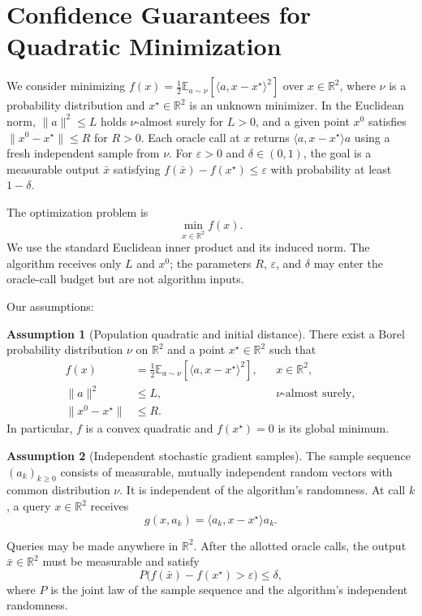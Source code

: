 \documentclass[10pt]{article}
\theoremstyle{definition}
\newtheorem{assumption}{Assumption}
\begin{document}
\section*{Confidence Guarantees for Quadratic Minimization}
We consider minimizing $f(x)=\tfrac12\mathbb{E}_{a\sim\nu}[\langle a,x-x^\star\rangle^2]$ over $x\in\mathbb{R}^2$, where $\nu$ is a probability distribution and $x^\star\in\mathbb{R}^2$ is an unknown minimizer. In the Euclidean norm, $\|a\|^2\leq L$ holds $\nu$-almost surely for $L>0$, and a given point $x^0$ satisfies $\|x^0-x^\star\|\leq R$ for $R>0$. Each oracle call at $x$ returns $\langle a,x-x^\star\rangle a$ using a fresh independent sample from $\nu$. For $\varepsilon>0$ and $\delta\in(0,1)$, the goal is a measurable output $\bar{x}$ satisfying $f(\bar{x})-f(x^\star)\leq\varepsilon$ with probability at least $1-\delta$.

The optimization problem is
\[
\min_{x\in\mathbb{R}^2} f(x).
\]
We use the standard Euclidean inner product and its induced norm. The algorithm receives only $L$ and $x^0$; the parameters $R$, $\varepsilon$, and $\delta$ may enter the oracle-call budget but are not algorithm inputs.

Our assumptions:
\begin{assumption}[Population quadratic and initial distance]
There exist a Borel probability distribution $\nu$ on $\mathbb{R}^2$ and a point $x^\star\in\mathbb{R}^2$ such that
\[
\begin{aligned}
f(x)&=\frac12\mathbb{E}_{a\sim\nu}
    [\langle a,x-x^\star\rangle^2],
    &&x\in\mathbb{R}^2,\\
\|a\|^2&\leq L,
    &&\nu\text{-almost surely},\\
\|x^0-x^\star\|&\leq R.
\end{aligned}
\]
In particular, $f$ is a convex quadratic and $f(x^\star)=0$ is its global minimum.
\end{assumption}

\begin{assumption}[Independent stochastic gradient samples]
The sample sequence $(a_k)_{k\geq0}$ consists of measurable, mutually independent random vectors with common distribution $\nu$. It is independent of the algorithm's randomness. At call $k$, a query $x\in\mathbb{R}^2$ receives
\[
g(x,a_k)=\langle a_k,x-x^\star\rangle a_k.
\]
\end{assumption}

Queries may be made anywhere in $\mathbb{R}^2$. After the allotted oracle calls, the output $\bar{x}\in\mathbb{R}^2$ must be measurable and satisfy
\[
P\bigl(f(\bar{x})-f(x^\star)>\varepsilon\bigr)\leq\delta,
\]
where $P$ is the joint law of the sample sequence and the algorithm's independent randomness.
\end{document}
